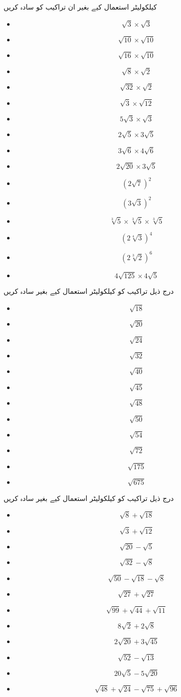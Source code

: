 کیلکولیٹر استعمال کیے بغیر ان تراکیب کو سادہ کریں
\begin{itemize}

\item
\[\sqrt{3}\times\sqrt{3}\]
\item
\[\sqrt{10}\times\sqrt{10}\]
\item
\[\sqrt{16}\times\sqrt{10}\]
\item
\[\sqrt{8}\times\sqrt{2}\]
\item
\[\sqrt{32}\times\sqrt{2}\]
\item
\[\sqrt{3}\times\sqrt{12}\]
\item
\[5\sqrt{3}\times\sqrt{3}\]
\item
\[2\sqrt{5}\times 3\sqrt{5}\]
\item
\[3\sqrt{6}\times 4\sqrt{6}\]
\item
\[2\sqrt{20}\times 3\sqrt{5}\]
\item
\[(2\sqrt{7})^{2}\]
\item
\[(3\sqrt{3})^{2}\]
\item
\[\sqrt[3]{5}\times\sqrt[3]{5}\times\sqrt[3]{5}\]
\item
\[(2\sqrt[4]{3})^4\]
\item
\[(2\sqrt[3]{2})^{6}\]
\item
\[4\sqrt{125}\times4\sqrt{5}\]
\end{itemize}
درج ذیل تراکیب کو کیلکولیٹر استعمال کیے بغیر سادہ کریں
\begin{itemize}
\item
\[\sqrt{18}\]
\item
\[\sqrt{20}\]
\item
\[\sqrt{24}\]
\item
\[\sqrt{32}\]
\item
\[\sqrt{40}\]
\item
\[\sqrt{45}\]
\item
\[\sqrt{48}\]
\item
\[\sqrt{50}\]
\item
\[\sqrt{54}\]
\item
\[\sqrt{72}\]
\item
\[\sqrt{175}\]
\item
\[\sqrt{675}\]
\end{itemize}
درج ذیل تراکیب کو کیلکولیٹر استعمال کیے بغیر سادہ کریں
\begin{itemize}
\item
\[\sqrt{8}+\sqrt{18}\]
\item
\[\sqrt{3}+\sqrt{12}\]
\item
\[\sqrt{20}-\sqrt{5}\]
\item
\[\sqrt{32}-\sqrt{8}\]
\item
\[\sqrt{50}-\sqrt{18}-\sqrt{8}\]
\item
\[\sqrt{27}+\sqrt{27}\]
\item
\[\sqrt{99}+\sqrt{44}+\sqrt{11}\]
\item
\[8\sqrt{2}+2\sqrt{8}\]
\item
\[2\sqrt{20}+3\sqrt{45}\]
\item
\[\sqrt{52}-\sqrt{13}\]
\item
\[20\sqrt{5}-5\sqrt{20}\]
\item
\[\sqrt{48}+\sqrt{24}-\sqrt{75}+\sqrt{96}\]
\end{itemize}
